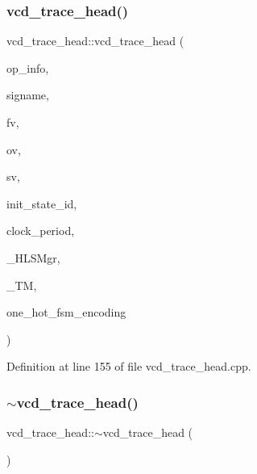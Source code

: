 \subsubsection{\texorpdfstring{vcd\+\_\+trace\+\_\+head()}{vcd\_trace\_head()}}
{\footnotesize\ttfamily vcd\+\_\+trace\+\_\+head\+::vcd\+\_\+trace\+\_\+head (\begin{DoxyParamCaption}\item[{const \hyperlink{classDiscrepancyOpInfo}{Discrepancy\+Op\+Info} \&}]{op\+\_\+info,  }\item[{std\+::string}]{signame,  }\item[{const std\+::list$<$ \hyperlink{structsig__variation}{sig\+\_\+variation} $>$ \&}]{fv,  }\item[{const std\+::list$<$ \hyperlink{structsig__variation}{sig\+\_\+variation} $>$ \&}]{ov,  }\item[{const std\+::list$<$ \hyperlink{structsig__variation}{sig\+\_\+variation} $>$ \&}]{sv,  }\item[{unsigned int}]{init\+\_\+state\+\_\+id,  }\item[{unsigned long long}]{clock\+\_\+period,  }\item[{const \hyperlink{hls__manager_8hpp_a1b481383e3beabc89bd7562ae672dd8c}{H\+L\+S\+\_\+manager\+Const\+Ref}}]{\+\_\+\+H\+L\+S\+Mgr,  }\item[{const \hyperlink{tree__manager_8hpp_a792e3f1f892d7d997a8d8a4a12e39346}{tree\+\_\+manager\+Const\+Ref}}]{\+\_\+\+TM,  }\item[{const bool}]{one\+\_\+hot\+\_\+fsm\+\_\+encoding }\end{DoxyParamCaption})}



Definition at line 155 of file vcd\+\_\+trace\+\_\+head.\+cpp.

\mbox{\label{structvcd__trace__head_af56db488ec24f5abbc725385b4e8fe31}} 
\subsubsection{\texorpdfstring{$\sim$vcd\+\_\+trace\+\_\+head()}{~vcd\_trace\_head()}}
{\footnotesize\ttfamily vcd\+\_\+trace\+\_\+head\+::$\sim$vcd\+\_\+trace\+\_\+head (\begin{DoxyParamCaption}{ }\end{DoxyParamCaption})\hspace{0.3cm}{\ttfamily [default]}}




